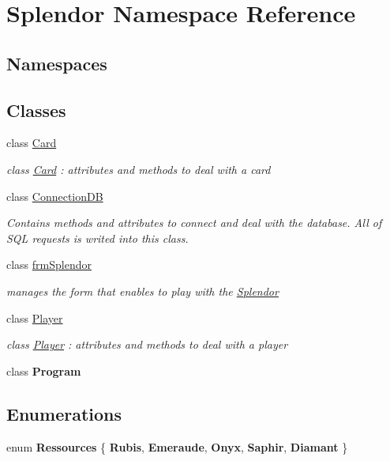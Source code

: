 \hypertarget{namespace_splendor}{}\section{Splendor Namespace Reference}
\label{namespace_splendor}
\subsection*{Namespaces}
\begin{DoxyCompactItemize}
\end{DoxyCompactItemize}
\subsection*{Classes}
\begin{DoxyCompactItemize}
\item 
class \mbox{\hyperlink{class_splendor_1_1_card}{Card}}
\begin{DoxyCompactList}\small\item\em class \mbox{\hyperlink{class_splendor_1_1_card}{Card}} \+: attributes and methods to deal with a card \end{DoxyCompactList}\item 
class \mbox{\hyperlink{class_splendor_1_1_connection_d_b}{Connection\+DB}}
\begin{DoxyCompactList}\small\item\em Contains methods and attributes to connect and deal with the database. All of S\+QL requests is writed into this class. \end{DoxyCompactList}\item 
class \mbox{\hyperlink{class_splendor_1_1frm_splendor}{frm\+Splendor}}
\begin{DoxyCompactList}\small\item\em manages the form that enables to play with the \mbox{\hyperlink{namespace_splendor}{Splendor}} \end{DoxyCompactList}\item 
class \mbox{\hyperlink{class_splendor_1_1_player}{Player}}
\begin{DoxyCompactList}\small\item\em class \mbox{\hyperlink{class_splendor_1_1_player}{Player}} \+: attributes and methods to deal with a player \end{DoxyCompactList}\item 
class {\bfseries Program}
\end{DoxyCompactItemize}
\subsection*{Enumerations}
\begin{DoxyCompactItemize}
\item 
\mbox{\label{namespace_splendor_abc955fe800ad5f701f777df0a2a29dc2}} 
enum {\bfseries Ressources} \{ \newline
{\bfseries Rubis}, 
{\bfseries Emeraude}, 
{\bfseries Onyx}, 
{\bfseries Saphir}, 
\newline
{\bfseries Diamant}
 \}
\end{DoxyCompactItemize}
